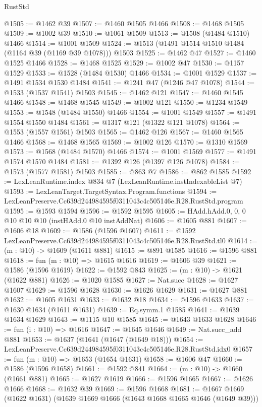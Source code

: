 \begin{lexlean}{RustStd}
\begin{coremodule}
@1505 := @1462 @39
@1507 := @1460 @1505 @1466
@1508 := @1468 @1505
@1509 := @1002 @39
@1510 := @1061 @1509
@1513 := @1508 (@1484 @1510) @1466
@1514 := @1001 @1509
@1524 := @1513 (@1491 @1514 @1510 @1484 (@1164 @39 (@1169 @39 @1078))) @1503
@1525 := @1462 @47
@1527 := @1460 @1525 @1466
@1528 := @1468 @1525
@1529 := @1002 @47
@1530 := @1157 @1529
@1533 := @1528 (@1484 @1530) @1466
@1534 := @1001 @1529
@1537 := @1491 @1534 @1530 @1484
@1541 := @1241 @47 (@1246 @47 @1078)
@1544 := @1533 (@1537 @1541) @1503
@1545 := @1462 @121
@1547 := @1460 @1545 @1466
@1548 := @1468 @1545
@1549 := @1002 @121
@1550 := @1234 @1549
@1553 := @1548 (@1484 @1550) @1466
@1554 := @1001 @1549
@1557 := @1491 @1554 @1550 @1484
@1561 := @1317 @121 (@1322 @121 @1078)
@1564 := @1553 (@1557 @1561) @1503
@1565 := @1462 @126
@1567 := @1460 @1565 @1466
@1568 := @1468 @1565
@1569 := @1002 @126
@1570 := @1310 @1569
@1573 := @1568 (@1484 @1570) @1466
@1574 := @1001 @1569
@1577 := @1491 @1574 @1570 @1484
@1581 := @1392 @126 (@1397 @126 @1078)
@1584 := @1573 (@1577 @1581) @1503
@1585 := @863 @7
@1586 := @862 @1585
@1592 := LexLeanRuntime.index @834 @7 (LexLeanRuntime.instIndexableList @7)
@1593 := LexLeanTarget.TargetSyntax.Program.functions
@1594 := LexLeanPreserve.Cc639d244984595f0311043c4c505146e.R28.RustStd.program
@1595 := @1593 @1594
@1596 := @1592 @1595
@1605 := HAdd.hAdd.{0, 0, 0} @10 @10 @10 (instHAdd.{0} @10 instAddNat)
@1606 := @1605 @881
@1607 := @1606 @18
@1609 := @1586 (@1596 @1607)
@1611 := @1592 LexLeanPreserve.Cc639d244984595f0311043c4c505146e.R28.RustStd.tl0
@1614 := (m : @10) -> @1609 (@1611 @881)
@1615 := @891 @1585
@1616 := @1596 @881
@1618 := fun (m : @10) => @1615 @1616
@1619 := @1606 @39
@1621 := @1586 (@1596 @1619)
@1622 := @1592 @843
@1625 := (m : @10) -> @1621 (@1622 @881)
@1626 := @1020 @1585
@1627 := Nat.succ
@1628 := @1627 @1607
@1629 := @1596 @1628
@1630 := @1626 @1629
@1631 := @1627 @881
@1632 := @1605 @1631
@1633 := @1632 @18
@1634 := @1596 @1633
@1637 := @1630 @1634 (@1611 @1631)
@1639 := Eq.symm.{1} @1585
@1641 := @1639 @1634 @1629
@1643 := @1115 @10 @1585
@1645 := @1643 @1633 @1628
@1646 := fun (i : @10) => @1616
@1647 := @1645 @1646
@1649 := Nat.succ_add @881
@1653 := @1637 (@1641 (@1647 (@1649 @18)))
@1654 := LexLeanPreserve.Cc639d244984595f0311043c4c505146e.R28.RustStd.idx0
@1657 := fun (m : @10) => @1653 (@1654 @1631)
@1658 := @1606 @47
@1660 := @1586 (@1596 @1658)
@1661 := @1592 @841
@1664 := (m : @10) -> @1660 (@1661 @881)
@1665 := @1627 @1619
@1666 := @1596 @1665
@1667 := @1626 @1666
@1668 := @1632 @39
@1669 := @1596 @1668
@1681 := @1667 @1669 (@1622 @1631) (@1639 @1669 @1666 (@1643 @1668 @1665 @1646 (@1649 @39)))

\end{coremodule}
\end{lexlean}
